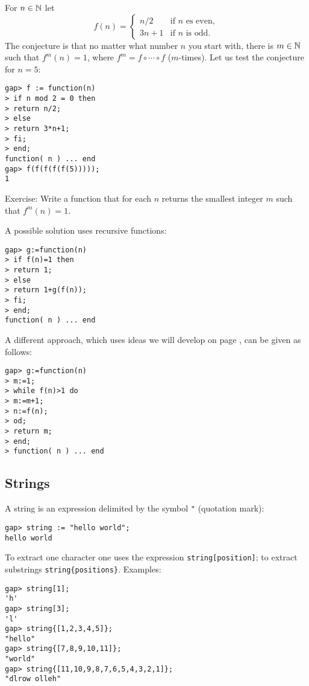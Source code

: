 \begin{example}
	\label{example:Collatz}
	For $n\in\mathbb{N}$ let 
	\[
		f(n)=\begin{cases}
			n/2 & \text{if $n$ es even},\\
			3n+1 & \text{if $n$ is odd}.
		\end{cases}
	\]
	The conjecture is that no matter what number $n$ you start with, there is
	$m\in\mathbb{N}$ such that $f^m(n)=1$, where $f^m=f\circ\cdots\circ f$ ($m$-times).
	Let us test the conjecture for $n=5$:
\begin{lstlisting}
gap> f := function(n)
> if n mod 2 = 0 then
> return n/2;
> else 
> return 3*n+1;
> fi;
> end;
function( n ) ... end
gap> f(f(f(f(f(5)))));
1
\end{lstlisting}
Exercise: Write a function that for each $n$ returns the smallest integer $m$ such that $f^m(n)=1$.

\medskip
A possible solution uses recursive functions:
\begin{lstlisting}
gap> g:=function(n)
> if f(n)=1 then
> return 1;
> else
> return 1+g(f(n));
> fi;
> end;
function( n ) ... end
\end{lstlisting}

A different approach, which uses ideas we will develop on page
\pageref{page:do}, can be given as follows:
\begin{lstlisting}
gap> g:=function(n)
> m:=1;
> while f(n)>1 do
> m:=m+1;
> n:=f(n);
> od;
> return m;
> end;
> function( n ) ... end
\end{lstlisting}
\end{example}



\subsection*{Strings}

A string is an expression delimited by the symbol 
\lstinline{"} (quotation mark): 
\begin{lstlisting}
gap> string := "hello world";
hello world
\end{lstlisting}
To extract one character one uses the expression \lstinline{string[position]};
to extract substrings \lstinline|string{positions}|. Examples:
\begin{lstlisting}
gap> string[1];
'h'
gap> string[3];
'l'
gap> string{[1,2,3,4,5]};
"hello"
gap> string{[7,8,9,10,11]};
"world"
gap> string{[11,10,9,8,7,6,5,4,3,2,1]};
"dlrow olleh"
\end{lstlisting}

